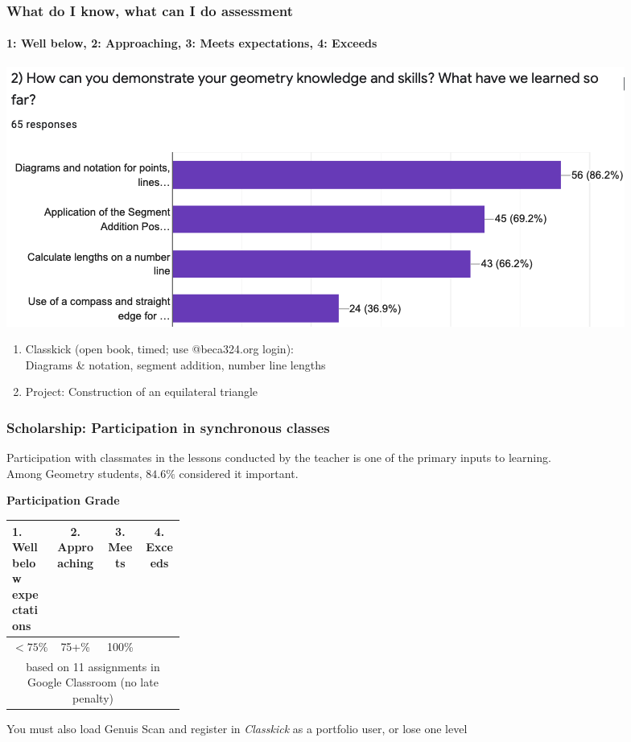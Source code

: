 \documentclass{beamer}
\begin{document}
  \frame
  {
    \frametitle{What do I know, what can I do assessment}
    \framesubtitle{1: Well below, 2: Approaching, 3: Meets expectations, 4: Exceeds}
  \includegraphics[width=.95\textwidth]{know+do-bar-chart.png}
    \begin{enumerate}
      \item Classkick (open book, timed; use @beca324.org login):\\ Diagrams \& notation, segment addition, number line lengths
      \item Project: Construction of an equilateral triangle
    \end{enumerate}
  }

  \frame
  {
    \frametitle{Scholarship: Participation in synchronous classes}
      Participation with classmates in the lessons conducted by the teacher is one of the primary inputs to learning.\\[0.25cm]
      Among Geometry students, $84.6\%$ considered it important. \vspace{0.5cm}
      \begin{table}[ht]
        \textbf{Participation Grade}
      \begin{tabular}[t]{p{0.25\linewidth} c c c }%
        \hline
        1. Well below \newline expectations & 2. Approaching & 3. Meets & 4. Exceeds \\
        \hline
        \hspace{0.5cm}$<75\%$ & 75+\% & 100\% &  \\[0.25cm]
        \multicolumn{4}{c}{based on 11 assignments in Google Classroom (no late penalty)} \\[0.25cm]
        \hline
      \end{tabular}
    \end{table} \vspace{0.25cm}
      You must also load Genuis Scan and register in \emph{Classkick} as a portfolio user, or lose one level
      \vspace{1cm}
  }
\end{document}
